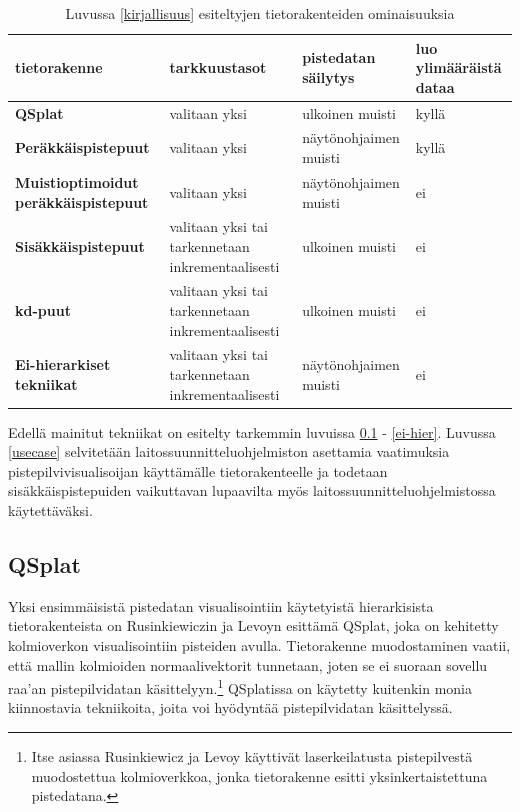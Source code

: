 \begin{table}[h]
\begin{tabular}{|p{4.0cm}|p{4.5cm}|p{3cm}|p{2.6cm}|}
\hline
\textbf{tietorakenne} & \textbf{tarkkuustasot} & \textbf{pistedatan säilytys} & \textbf{luo ylimääräistä dataa} \\ \hline
\textbf{QSplat \cite{qsplat}} & valitaan yksi & ulkoinen muisti & kyllä                           \\ \hline
\textbf{Peräkkäispistepuut \cite{spt}} & valitaan yksi & näytönohjaimen muisti & kyllä \\ \hline
\textbf{Muistioptimoidut peräkkäispistepuut \cite{ip}} & valitaan yksi & näytönohjaimen muisti & ei \\ \hline
\textbf{Sisäkkäispistepuut \cite{scheiblauer}\cite{potree}} & valitaan yksi tai tarkennetaan inkrementaalisesti & ulkoinen muisti & ei \\ \hline
\textbf{kd-puut \cite{richter}\cite{smooth}} & valitaan yksi tai tarkennetaan inkrementaalisesti & ulkoinen muisti & ei \\ \hline
\textbf{Ei-hierarkiset tekniikat \cite{clod}\cite{progressive}} & valitaan yksi tai tarkennetaan inkrementaalisesti & näytönohjaimen muisti        & ei \\ \hline
\end{tabular}
\caption{Luvussa \ref{kirjallisuus} esiteltyjen tietorakenteiden ominaisuuksia}
\label{ominaisuudet}
\end{table}


Edellä mainitut tekniikat on esitelty tarkemmin luvuissa \ref{qsplat} - \ref{ei-hier}. Luvussa \ref{usecase} selvitetään laitossuunnitteluohjelmiston asettamia vaatimuksia pistepilvivisualisoijan käyttämälle tietorakenteelle ja todetaan sisäkkäispistepuiden vaikuttavan lupaavilta myös laitossuunnitteluohjelmistossa käytettäväksi. 

\subsection{QSplat}\label{qsplat}
Yksi ensimmäisistä pistedatan visualisointiin käytetyistä hierarkisista tietorakenteista on Rusinkiewiczin ja Levoyn esittämä QSplat, joka on kehitetty kolmioverkon visualisointiin pisteiden avulla. Tietorakenne muodostaminen vaatii, että mallin kolmioiden normaalivektorit tunnetaan, joten se ei suoraan sovellu raa'an pistepilvidatan käsittelyyn.\footnote{Itse asiassa Rusinkiewicz ja Levoy käyttivät laserkeilatusta pistepilvestä muodostettua kolmioverkkoa, jonka tietorakenne esitti yksinkertaistettuna pistedatana.} QSplatissa on käytetty kuitenkin monia kiinnostavia tekniikoita, joita voi hyödyntää pistepilvidatan käsittelyssä. \cite{qsplat}

